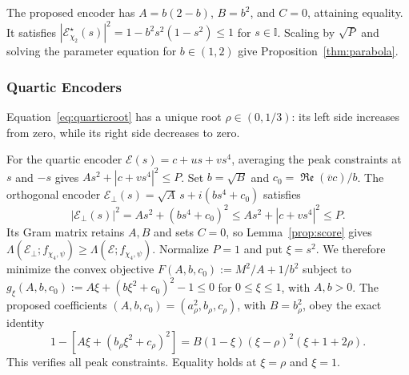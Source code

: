 \documentclass[journal,12pt,onecolumn,draftclsnofoot]{IEEEtran}
\newcommand{\enc}{\mathscr{E}}\newcommand{\dec}{\mathscr{D}}\newcommand{\R}{\mathbb R}\newcommand{\C}{\mathbb C}
\renewcommand{\Re}{\mathop{\mathfrak{Re}}\nolimits}
\begin{document}
The proposed encoder has $A=b(2-b)$, $B=b^2$, and $C=0$, attaining equality. It satisfies
$|\enc_{\chi_2}^\star(s)|^2=1-b^2s^2(1-s^2)\le1$ for $s\in\mathbb I$.
Scaling by $\sqrt P$ and solving the parameter equation for $b\in(1,2)$ give Proposition~\ref{thm:parabola}.



\subsubsection{Quartic Encoders}\label{app:quartic-case-proof}


Equation~\eqref{eq:quarticroot} has a unique root $\rho\in(0,1/3)$: its left side increases from zero, while its right side decreases to zero.

For the quartic encoder $\enc(s)=c+us+vs^4$, averaging the peak constraints at $s$ and $-s$ gives $As^2+|c+vs^4|^2\le P$.
Set $b=\sqrt B$ and $c_0=\Re(\overline v c)/b$. The orthogonal encoder $\enc_\perp(s)=\sqrt A\,s+i(bs^4+c_0)$ satisfies
$$
|\enc_\perp(s)|^2=As^2+(bs^4+c_0)^2
\le As^2+|c+vs^4|^2\le P.
$$
Its Gram matrix retains $A,B$ and sets $C=0$, so Lemma~\ref{prop:score} gives $\Lambda(\enc_\perp;f_{\chi_4,\psi})\ge\Lambda(\enc;f_{\chi_4,\psi})$.
Normalize $P=1$ and put $\xi=s^2$. We therefore minimize the convex objective $F(A,b,c_0):=M^2/A+1/b^2$ subject to
$g_\xi(A,b,c_0):=A\xi+(b\xi^2+c_0)^2-1\le0$ for $0\le\xi\le1$, with $A,b>0$.
The proposed coefficients $(A,b,c_0)=(a_\rho^2,b_\rho,c_\rho)$, with $B=b_\rho^2$, obey the exact identity
\begin{equation}
 1-\left[A\xi+(b_\rho\xi^2+c_\rho)^2\right]
 =B(1-\xi)(\xi-\rho)^2(\xi+1+2\rho).
 \label{eq:quarticpeak}
\end{equation}
This verifies all peak constraints. Equality holds at $\xi=\rho$ and $\xi=1$.
\end{document}
